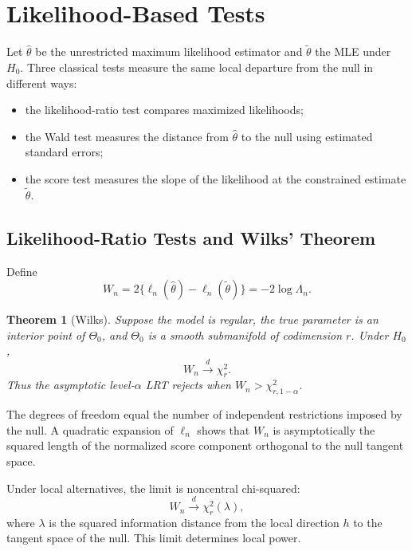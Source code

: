 \documentclass[12pt,oneside]{book}
\numberwithin{equation}{section}
\theoremstyle{definition}
\theoremstyle{plain}
\newtheorem{theorem}{Theorem}[section]
\theoremstyle{remark}
\newcommand{\convd}{\overset{d}{\to}}
\begin{document}
\section{Likelihood-Based Tests}

Let $\widehat\theta$ be the unrestricted maximum likelihood estimator and
$\widetilde\theta$ the MLE under $H_0$.  Three classical tests measure the
same local departure from the null in different ways:
\begin{itemize}
    \item the likelihood-ratio test compares maximized likelihoods;
    \item the Wald test measures the distance from $\widehat\theta$ to the
    null using estimated standard errors;
    \item the score test measures the slope of the likelihood at the
    constrained estimate $\widetilde\theta$.
\end{itemize}

\subsection{Likelihood-Ratio Tests and Wilks' Theorem}

Define
\begin{equation}
    W_n=2\{\ell_n(\widehat\theta)-\ell_n(\widetilde\theta)\}
       =-2\log\Lambda_n.
    \label{eq:asymptotic-lr-statistic}
\end{equation}

\begin{theorem}[Wilks]
Suppose the model is regular, the true parameter is an interior point of
$\Theta_0$, and $\Theta_0$ is a smooth submanifold of codimension $r$.  Under
$H_0$,
\[
    W_n\convd\chi_r^2.
\]
Thus the asymptotic level-$\alpha$ LRT rejects when
$W_n>\chi^2_{r,1-\alpha}$.
\end{theorem}

The degrees of freedom equal the number of independent restrictions imposed
by the null.  A quadratic expansion of $\ell_n$ shows that $W_n$ is
asymptotically the squared length of the normalized score component
orthogonal to the null tangent space.

Under local alternatives, the limit is noncentral chi-squared:
\begin{equation}
    W_n\convd\chi_r^2(\lambda),
    \label{eq:noncentral-wilks}
\end{equation}
where $\lambda$ is the squared information distance from the local direction
$h$ to the tangent space of the null.  This limit determines local power.
\end{document}
